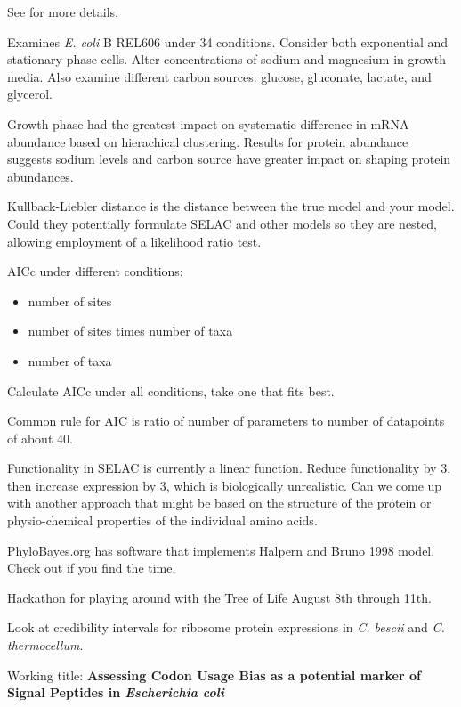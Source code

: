 \documentclass[11pt]{labbook}
\begin{document}
See \cite{caglar2017} for more details.

Examines \textit{E. coli} B REL606 under 34 conditions. Consider both exponential and stationary phase cells. Alter concentrations of sodium and magnesium in growth media. Also examine different carbon sources: glucose, gluconate, lactate, and glycerol.

Growth phase had the greatest impact on systematic difference in mRNA abundance based on hierachical clustering. Results for protein abundance suggests sodium levels and carbon source have greater impact on shaping protein abundances. 



Kullback-Liebler distance is the distance between the true model and your model. Could they potentially formulate SELAC and other models so they are nested, allowing employment of a likelihood ratio test. 

AICc under different conditions:
\begin{itemize}
\item number of sites
\item number of sites times number of taxa
\item number of taxa
\end{itemize}
Calculate AICc under all conditions, take one that fits best. 

Common rule for AIC is ratio of number of parameters to number of datapoints of about 40. 

Functionality in SELAC is currently a linear function. Reduce functionality by 3, then increase expression by 3, which is biologically unrealistic. Can we come up with another approach that might be based on the structure of the protein or physio-chemical properties of the individual amino acids. 

PhyloBayes.org has software that implements Halpern and Bruno 1998 model. Check out if you find the time. 

Hackathon for playing around with the Tree of Life August 8th through 11th. 

Look at credibility intervals for ribosome protein expressions in \textit{C. bescii} and \textit{C. thermocellum}.

Working title: \textbf{Assessing Codon Usage Bias as a potential marker of Signal Peptides in \textit{Escherichia coli}}
\end{document}
